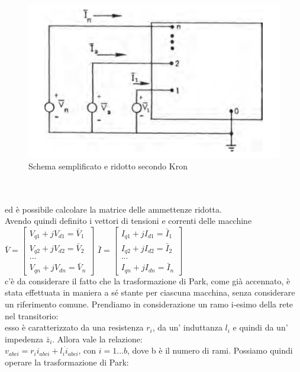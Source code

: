 \documentclass[Lau,noexaminfo]{sapthesis}
\begin{document}
	\begin{figure}
		\centering
		\includegraphics[height=0.30\textheight]{ridotta}
		\caption{Schema semplificato e ridotto secondo Kron}
	\end{figure}
	\\\\
	ed è possibile calcolare la matrice delle ammettenze ridotta.\\
	Avendo quindi definito i vettori di tensioni e correnti delle macchine\\
	$\bar{V}=\begin{bmatrix}
	V_{q1}+jV_{d1}=\bar{V}_1\\
	V_{q2}+jV_{d2}=\bar{V}_2\\
	...\\
	V_{qn}+jV_{dn}=\bar{V}_n
	\end{bmatrix}$\qquad
	$\bar{I}=\begin{bmatrix}
	I_{q1}+jI_{d1}=\bar{I}_1\\
	I_{q2}+jI_{d2}=\bar{I}_2\\
	...\\
	I_{qn}+jI_{dn}=\bar{I}_n
	\end{bmatrix}$\\
	c'è da considerare il fatto che la trasformazione di Park, come già accennato, è stata effettuata in maniera a sé stante per ciascuna macchina, senza considerare un riferimento comune.
	Prendiamo in considerazione un ramo i-esimo della rete nel transitorio:\\
	esso è caratterizzato da una resistenza $r_i$, da un' induttanza $l_i$ e quindi da un' impedenza $\bar{z}_i$. Allora vale la relazione:\\
	$v_{abci}=r_ii_{abci}+l_i\dot{i}_{abci}$, con $i=1...b$, dove b è il numero di rami.
	Possiamo quindi operare la trasformazione di Park:\\
\end{document}
